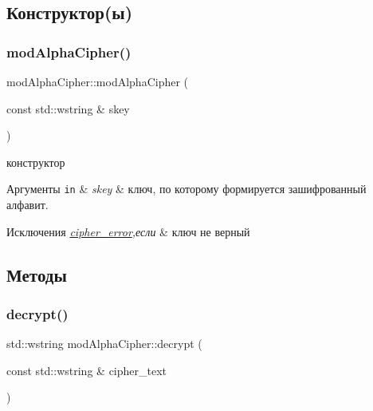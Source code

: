 \subsection{Конструктор(ы)}
\mbox{\label{classmodAlphaCipher_a314fca132f4e74faca280b7c1fad7cb5}} 
\subsubsection{\texorpdfstring{mod\+Alpha\+Cipher()}{modAlphaCipher()}}
{\footnotesize\ttfamily mod\+Alpha\+Cipher\+::mod\+Alpha\+Cipher (\begin{DoxyParamCaption}\item[{const std\+::wstring \&}]{skey }\end{DoxyParamCaption})}



конструктор 


\begin{DoxyParams}[1]{Аргументы}
\mbox{\tt in}  & {\em skey} & ключ, по которому формируется зашифрованный алфавит. \\
\hline
\end{DoxyParams}

\begin{DoxyExceptions}{Исключения}
{\em \hyperlink{classcipher__error}{cipher\+\_\+error},если} & ключ не верный \\
\hline
\end{DoxyExceptions}


\subsection{Методы}
\mbox{\label{classmodAlphaCipher_a941eab79d9ec1a8de4e1f9cf2a80ff35}} 
\subsubsection{\texorpdfstring{decrypt()}{decrypt()}}
{\footnotesize\ttfamily std\+::wstring mod\+Alpha\+Cipher\+::decrypt (\begin{DoxyParamCaption}\item[{const std\+::wstring \&}]{cipher\+\_\+text }\end{DoxyParamCaption})}



